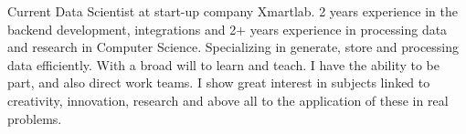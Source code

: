 

\begin{cvparagraph}

Current Data Scientist at start-up company Xmartlab. 2 years experience in the backend development, integrations and 2+ years experience in processing data and research in Computer Science. 
Specializing in generate, store and processing data efficiently. With a broad will to learn and teach. I have the ability to be part, and also direct work teams. I show great interest in subjects linked to creativity, innovation, research and above all to the application of these in real problems.
\end{cvparagraph}

